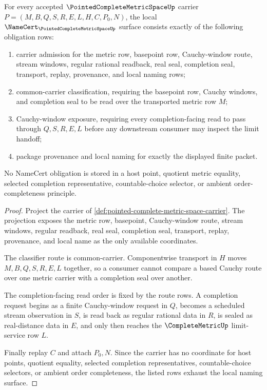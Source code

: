 \begin{theorem}
\label{thm:pointed-complete-metric-space-namecert-obligations}
For every accepted $\PointedCompleteMetricSpaceUp$ carrier
$P=(M,B,Q,S,R,E,L,H,C,P_0,N)$, the local
$\NameCert_{\PointedCompleteMetricSpaceUp}$ surface consists exactly of the
following obligation rows:
\begin{enumerate}
\item carrier admission for the metric row, basepoint row, Cauchy-window
route, stream windows, regular rational readback, real seal, completion seal,
transport, replay, provenance, and local naming rows;
\item common-carrier classification, requiring the basepoint row, Cauchy
windows, and completion seal to be read over the transported metric row $M$;
\item Cauchy-window exposure, requiring every completion-facing read to pass
through $Q,S,R,E,L$ before any downstream consumer may inspect the limit
handoff;
\item package provenance and local naming for exactly the displayed finite
packet.
\end{enumerate}
No NameCert obligation is stored in a host point, quotient metric equality,
selected completion representative, countable-choice selector, or ambient
order-completeness principle.
\end{theorem}
\begin{proof}
Project the carrier of
\autoref{def:pointed-complete-metric-space-carrier}. The projection exposes
the metric row, basepoint, Cauchy-window route, stream windows, regular
readback, real seal, completion seal, transport, replay, provenance, and local
name as the only available coordinates.

The classifier route is common-carrier. Componentwise transport in $H$ moves
$M,B,Q,S,R,E,L$ together, so a consumer cannot compare a based Cauchy route
over one metric carrier with a completion seal over another.

The completion-facing read order is fixed by the route rows. A completion
request begins as a finite Cauchy-window request in $Q$, becomes a scheduled
stream observation in $S$, is read back as regular rational data in $R$, is
sealed as real-distance data in $E$, and only then reaches the
$\CompleteMetricUp$ limit-service row $L$.

Finally replay $C$ and attach $P_0,N$. Since the carrier has no coordinate for
host points, quotient equality, selected completion representatives,
countable-choice selectors, or ambient order completeness, the listed rows
exhaust the local naming surface.
\end{proof}

